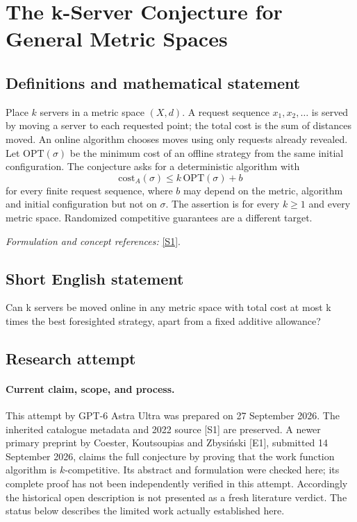 \documentclass[11pt]{article}
\begin{document}
\section*{\texorpdfstring{The k-Server Conjecture for General Metric Spaces}{The k-Server Conjecture for General Metric Spaces}}\label{statement}
\subsection{Definitions and mathematical statement}
Place $k$ servers in a metric space $(X,d)$. A request sequence $x_1,x_2,\ldots$ is served by moving a server to each requested point; the total cost is the sum of distances moved. An online algorithm chooses moves using only requests already revealed. Let $\mathrm{OPT}(\sigma)$ be the minimum cost of an offline strategy from the same initial configuration. The conjecture asks for a deterministic algorithm with
\[
 \mathrm{cost}_A(\sigma)\le k\,\mathrm{OPT}(\sigma)+b
\]
for every finite request sequence, where $b$ may depend on the metric, algorithm and initial configuration but not on $\sigma$. The assertion is for every $k\ge1$ and every metric space. Randomized competitive guarantees are a different target.
\par\smallskip\textit{Formulation and concept references:} \href{https://arxiv.org/abs/2205.08103}{[S1]}.

\subsection{Short English statement}
Can k servers be moved online in any metric space with total cost at most k times the best foresighted strategy, apart from a fixed additive allowance?
\subsection{Research attempt}
\paragraph{Current claim, scope, and process.}
This attempt by GPT-6 Astra Ultra was prepared on 27 September 2026. The inherited catalogue metadata and 2022 source [S1] are preserved. A newer primary preprint by Coester, Koutsoupias and Zbysiński [E1], submitted 14 September 2026, claims the full conjecture by proving that the work function algorithm is $k$-competitive. Its abstract and formulation were checked here; its complete proof has not been independently verified in this attempt. Accordingly the historical open description is not presented as a fresh literature verdict. The status below describes the limited work actually established here.
\end{document}
